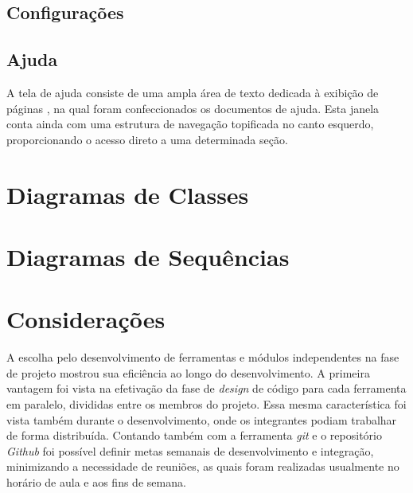 \subsection{Configurações}



\subsection{Ajuda}

A tela de ajuda consiste de uma ampla área de texto dedicada à exibição de páginas , na qual foram confeccionados os documentos de ajuda.
Esta janela conta ainda com uma estrutura de navegação topificada no canto esquerdo, proporcionando o acesso direto a uma determinada seção.

\section{Diagramas de Classes}

\section{Diagramas de Sequências}
\section{Considerações}

A escolha pelo desenvolvimento de ferramentas e módulos independentes na fase de projeto mostrou sua eficiência ao longo do desenvolvimento. 
A primeira vantagem foi vista na efetivação da fase de \emph{design} de código para cada ferramenta em paralelo, divididas entre os membros do projeto.
Essa mesma característica foi vista também durante o desenvolvimento, onde os integrantes podiam trabalhar de forma distribuída.
Contando também com a ferramenta \emph{git} e o repositório \emph{Github} foi possível definir metas semanais de desenvolvimento e integração, minimizando a necessidade de reuniões, as quais foram realizadas usualmente no horário de aula e aos fins de semana.
